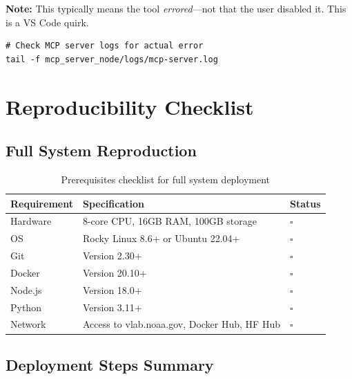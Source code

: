 \documentclass[11pt,letterpaper,twoside]{article}
\begin{document}
\begin{componentbox}
\textbf{Note:} This typically means the tool \textit{errored}—not that the user disabled it. This is a VS Code quirk.

\begin{lstlisting}[style=bashstyle]
# Check MCP server logs for actual error
tail -f mcp_server_node/logs/mcp-server.log
\end{lstlisting}
\end{componentbox}

\newpage
\section{Reproducibility Checklist}

\subsection{Full System Reproduction}

\begin{table}[H]
\centering
\renewcommand{\arraystretch}{1.3}
\begin{tabular}{l|l|l}
\toprule
\textbf{Requirement} & \textbf{Specification} & \textbf{Status} \\
\midrule
Hardware & 8-core CPU, 16GB RAM, 100GB storage & $\square$ \\
OS & Rocky Linux 8.6+ or Ubuntu 22.04+ & $\square$ \\
Git & Version 2.30+ & $\square$ \\
Docker & Version 20.10+ & $\square$ \\
Node.js & Version 18.0+ & $\square$ \\
Python & Version 3.11+ & $\square$ \\
Network & Access to vlab.noaa.gov, Docker Hub, HF Hub & $\square$ \\
\bottomrule
\end{tabular}
\caption{Prerequisites checklist for full system deployment}
\end{table}

\subsection{Deployment Steps Summary}
\end{document}
